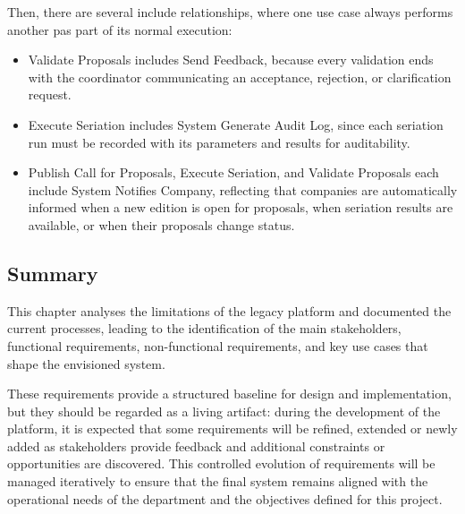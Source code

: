         {
            Then, there are several include relationships, where one use case always performs another pas part of its normal execution:
        }
            \begin{itemize}
                \item {
                    Validate Proposals includes Send Feedback, because every validation ends with the coordinator communicating 
                    an acceptance, rejection, or clarification request.
                }
                \item {
                    Execute Seriation includes System Generate Audit Log, since each seriation run must be recorded with its parameters and results
                    for auditability.
                }
                \item {
                    Publish Call for Proposals, Execute Seriation, and Validate Proposals each include System Notifies Company, reflecting that companies
                    are automatically informed when a new edition is open for proposals, when seriation results are available, or when their proposals change status.
                }

            \end{itemize}
    
    \subsection{Summary}
            {
                This chapter analyses the limitations of the legacy platform and documented the current processes, leading to the identification
                of the main stakeholders, functional requirements, non-functional requirements, and key use cases that shape the envisioned system.
            }

            {
                These requirements provide a structured baseline for design and implementation, but they should be regarded as a living artifact:
                during the development of the platform, it is expected that some requirements will be refined, extended or newly added as stakeholders 
                provide feedback and additional constraints or opportunities are discovered.
                This controlled evolution of requirements will be managed iteratively to ensure that the final system remains aligned with 
                the operational needs of the department and the objectives defined for this project.
            }